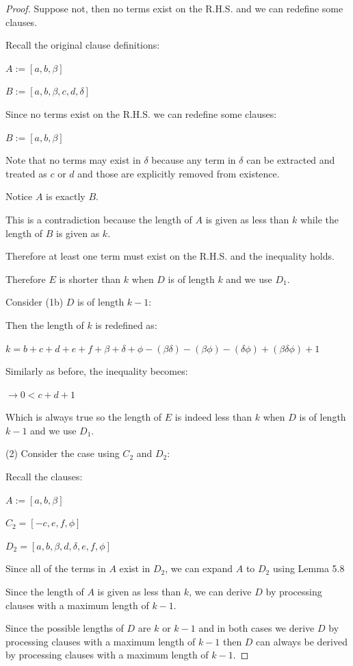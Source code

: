 \documentclass[manuscript]{acmart}
\begin{document}
\begin{proof}
        Suppose not, then no terms exist on the R.H.S. and we can redefine some clauses.

        Recall the original clause definitions:

        $A := [a, b, \beta]$

        $B := [a, b, \beta, c, d, \delta]$

        Since no terms exist on the R.H.S. we can redefine some clauses:

        $B := [a, b, \beta]$

        Note that no terms may exist in $\delta$ because any term in $\delta$ can be extracted and treated as $c$ or $d$ and those are explicitly removed from existence.

        Notice $A$ is exactly $B$.

        This is a contradiction because the length of $A$ is given as less than $k$ while the length of $B$ is given as $k$.

        Therefore at least one term must exist on the R.H.S. and the inequality holds.

        Therefore $E$ is shorter than $k$ when $D$ is of length $k$ and we use $D_1$.

        Consider (1b) $D$ is of length $k - 1$:

        Then the length of $k$ is redefined as:

        $k = b + c + d + e + f + \beta + \delta + \phi - (\beta \delta) 
        - (\beta \phi) - (\delta \phi) + (\beta \delta \phi) + 1$

        Similarly as before, the inequality becomes:

        $\rightarrow 0 < c + d + 1$

        Which is always true so the length of $E$ is indeed less than $k$ when $D$ is of length $k - 1$ and we use $D_1$.

        (2) Consider the case using $C_2$ and $D_2$:
        
        Recall the clauses:

        $A := [a, b, \beta]$

        $C_2 = [-c, e, f, \phi]$

        $D_2 = [a, b, \beta, d, \delta, e, f, \phi]$

        Since all of the terms in $A$ exist in $D_2$, we can expand $A$ to $D_2$ using Lemma 5.8

        Since the length of $A$ is given as less than $k$, we can derive $D$ by processing clauses with a maximum length of $k - 1$.
        
        Since the possible lengths of $D$ are $k$ or $k - 1$ and in both cases we derive $D$ by processing clauses with a maximum length of $k - 1$ then $D$ can always be derived by processing clauses with a maximum length of $k - 1$.
    \end{proof}
\end{document}
